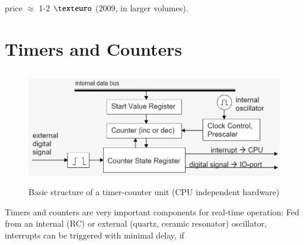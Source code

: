 
\os{\newpage}
price $\mathrm{\approx}$ 1-2 $\texteuro$ (2009, in larger volumes).

\nsl{\newpage}

\section{Timers and Counters}

 \begin{figure}[h]
    \centering
    \includegraphics[width=14cm, height=5cm]{Images/image162.png}
    \caption{Basic structure of a timer-counter unit (CPU independent hardware)}
    \label{fig:Fig 115}
    \end{figure}

Timers and counters are very important components for real-time operation: Fed from an internal (RC) or external (quartz, ceramic resonator) oscillator, interrupts can be triggered with minimal delay, if

